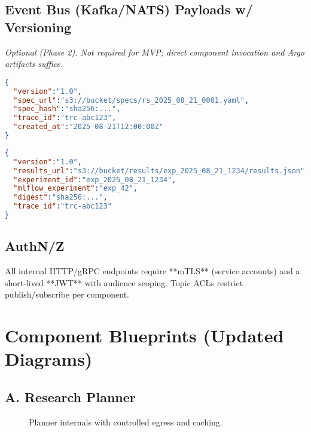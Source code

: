 \subsection{Event Bus (Kafka/NATS) Payloads w/ Versioning}
\textit{Optional (Phase 2). Not required for MVP; direct component invocation and Argo artifacts suffice.}
\begin{lstlisting}[style=code,language=json,caption={Event: research.spec.created v1}]
{
  "version":"1.0",
  "spec_url":"s3://bucket/specs/rs_2025_08_21_0001.yaml",
  "spec_hash":"sha256:...",
  "trace_id":"trc-abc123",
  "created_at":"2025-08-21T12:00:00Z"
}
\end{lstlisting}

\begin{lstlisting}[style=code,language=json,caption={Event: research.results.available v1}]
{
  "version":"1.0",
  "results_url":"s3://bucket/results/exp_2025_08_21_1234/results.json",
  "experiment_id":"exp_2025_08_21_1234",
  "mlflow_experiment":"exp_42",
  "digest":"sha256:...",
  "trace_id":"trc-abc123"
}
\end{lstlisting}

\subsection{AuthN/Z}
All internal HTTP/gRPC endpoints require **mTLS** (service accounts) and a short‑lived **JWT** with audience scoping. Topic ACLs restrict publish/subscribe per component.

\section{Component Blueprints (Updated Diagrams)}
\subsection{A. Research Planner}
\begin{figure}[h]
\centering
{}
\caption{Planner internals with controlled egress and caching.}
\end{figure}

